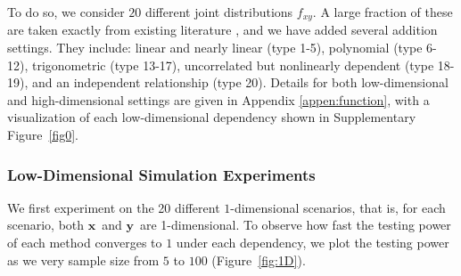 \documentclass[11pt]{article}
\newcommand{\note}[2][]{\added[#1,remark={#2}]{}}
\providecommand{\sct}[1]{{\sc \texttt{#1}}}
\providecommand{\mb}[1]{\boldsymbol{#1}}
\newcommand{\Mgc}{\sct{Mgc}}
\newcommand{\Hhg}{\sct{Hhg}}
\newcommand{\Dcorr}{\sct{Dcorr}}
\newcommand{\Mcorr}{\sct{Mcorr}}
\newcommand{\Mantel}{\sct{Mantel}}
\newcommand{\cs}[1]{{\note{cs: #1}}}
\newcommand{\mbx}{\ensuremath{\mb{x}}}
\newcommand{\mby}{\ensuremath{\mb{y}}}
\begin{document}

To do so, we consider  $20$ different joint distributions $f_{xy}$. A large fraction of these are taken exactly from existing literature \cite{SzekelyRizzoBakirov2007, SimonTibshirani2012, GorfineHellerHeller2012, HellerGorfine2013}, and we have added several addition settings.  They include: 
linear and nearly linear  (type 1-5), 
polynomial   (type 6-12), 
trigonometric (type 13-17), 
uncorrelated but nonlinearly dependent  (type 18-19), 
and an independent relationship (type 20).
Details for both low-dimensional and high-dimensional settings are given in Appendix \ref{appen:function}, with a visualization of each low-dimensional dependency shown in Supplementary Figure~\ref{fig0}.

\subsubsection{Low-Dimensional Simulation Experiments}
\label{numer1}



We first experiment on the 20 different $1$-dimensional scenarios, that is, for each scenario, both \mbx~and \mby~are 1-dimensional. To observe how fast the testing power of each method converges to $1$ under each dependency, we plot the testing power as we very sample  size from $5$ to $100$  (Figure~\ref{fig:1D}).
\cs{deleted, technical, it should go in the figure caption and the appendix:, based on $r=10$,$000$ Monte-Carlo replicates at type $1$ error level $\alpha=0.05$. Note that $2$,$000$ additional MC replicates are used for optimal scale estimation for \Mgc.} %
\end{document}

